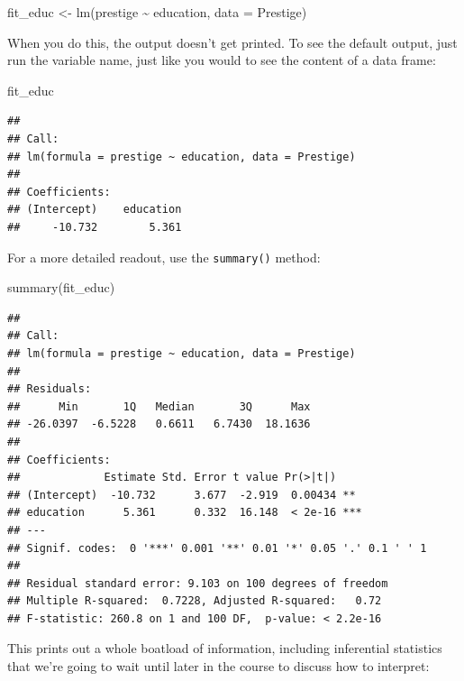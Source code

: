 \documentclass[
  12pt,
  oneside,openany]{book}
\newenvironment{Shaded}{\begin{snugshade}}{\end{snugshade}}
\newcommand{\AttributeTok}[1]{\textcolor[rgb]{0.77,0.63,0.00}{#1}}
\newcommand{\FunctionTok}[1]{\textcolor[rgb]{0.00,0.00,0.00}{#1}}
\newcommand{\NormalTok}[1]{#1}
\newcommand{\OtherTok}[1]{\textcolor[rgb]{0.56,0.35,0.01}{#1}}
\newcommand{\SpecialCharTok}[1]{\textcolor[rgb]{0.00,0.00,0.00}{#1}}
\begin{document}
\begin{Shaded}
\begin{Highlighting}[]
\NormalTok{fit\_educ }\OtherTok{\textless{}{-}} \FunctionTok{lm}\NormalTok{(prestige }\SpecialCharTok{\textasciitilde{}}\NormalTok{ education, }\AttributeTok{data =}\NormalTok{ Prestige)}
\end{Highlighting}
\end{Shaded}

When you do this, the output doesn't get printed. To see the default output, just run the variable name, just like you would to see the content of a data frame:

\begin{Shaded}
\begin{Highlighting}[]
\NormalTok{fit\_educ}
\end{Highlighting}
\end{Shaded}

\begin{verbatim}
## 
## Call:
## lm(formula = prestige ~ education, data = Prestige)
## 
## Coefficients:
## (Intercept)    education  
##     -10.732        5.361
\end{verbatim}

For a more detailed readout, use the \texttt{summary()} method:

\begin{Shaded}
\begin{Highlighting}[]
\FunctionTok{summary}\NormalTok{(fit\_educ)}
\end{Highlighting}
\end{Shaded}

\begin{verbatim}
## 
## Call:
## lm(formula = prestige ~ education, data = Prestige)
## 
## Residuals:
##      Min       1Q   Median       3Q      Max 
## -26.0397  -6.5228   0.6611   6.7430  18.1636 
## 
## Coefficients:
##             Estimate Std. Error t value Pr(>|t|)    
## (Intercept)  -10.732      3.677  -2.919  0.00434 ** 
## education      5.361      0.332  16.148  < 2e-16 ***
## ---
## Signif. codes:  0 '***' 0.001 '**' 0.01 '*' 0.05 '.' 0.1 ' ' 1
## 
## Residual standard error: 9.103 on 100 degrees of freedom
## Multiple R-squared:  0.7228, Adjusted R-squared:   0.72 
## F-statistic: 260.8 on 1 and 100 DF,  p-value: < 2.2e-16
\end{verbatim}

This prints out a whole boatload of information, including inferential statistics that we're going to wait until later in the course to discuss how to interpret:
\end{document}
